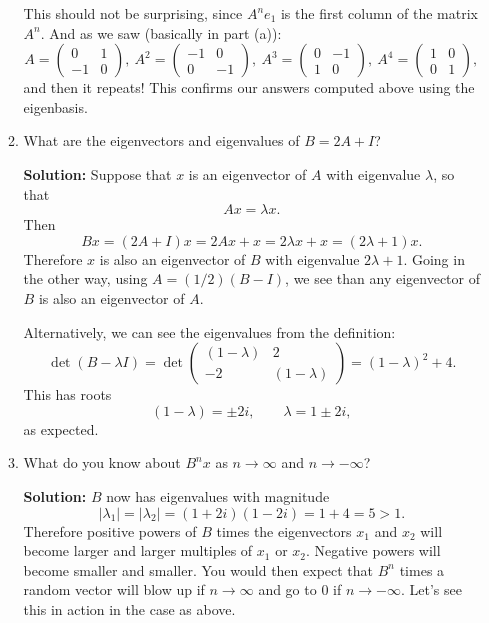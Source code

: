 \documentclass[11pt]{article}
\begin{document}
\begin{enumerate}
\begin{enumerate}
This should not be surprising, since $A^n e_1$ is the first column of the matrix $A^n$.  And as we saw (basically in part (a)):
\[A = \begin{pmatrix} 0 & 1 \\ -1 & 0 \end{pmatrix}, \ A^2 = \begin{pmatrix} -1 & 0 \\ 0 & -1 \end{pmatrix}, \ A^3 = \begin{pmatrix} 0 & -1 \\ 1 & 0 \end{pmatrix}, \ A^4 = \begin{pmatrix} 1 & 0 \\ 0 & 1 \end{pmatrix},\]
and then it repeats!  This confirms our answers computed above using the eigenbasis.

\item What are the eigenvectors and eigenvalues of $B = 2A + I$?

\textbf{Solution:} Suppose that $x$ is an eigenvector of $A$ with eigenvalue $\lambda$, so that 
\[Ax = \lambda x.\]
Then
\[Bx = (2A + I)x = 2Ax + x = 2\lambda x + x = (2\lambda + 1)x. \]
Therefore $x$ is also an eigenvector of $B$ with eigenvalue $2\lambda + 1$.
Going in the other way, using $A = (1/2)(B-I)$, we see than any eigenvector of $B$ is also an eigenvector of $A$.

Alternatively, we can see the eigenvalues from the definition:
\[\det(B - \lambda I) = \det \begin{pmatrix} (1-\lambda) & 2 \\ -2 & (1-\lambda) \end{pmatrix} = (1-\lambda)^2 + 4.\]
This has roots
\[(1-\lambda) = \pm 2 i, \qquad \lambda = 1 \pm 2 i, \]
as expected.

\item What do you know about $B^nx$ as $n \to \infty$ and $n \to -\infty$?

\textbf{Solution:} $B$ now has eigenvalues with magnitude
\[|\lambda_1| = |\lambda_2| = (1+2i)(1-2i) = 1 + 4 = 5 > 1.\]
Therefore positive powers of $B$ times the eigenvectors $x_1$ and $x_2$ will become larger and larger multiples of $x_1$ or $x_2$.  Negative powers will become smaller and smaller.  You would then expect that $B^n$ times a random vector will blow up if $n \to \infty$ and go to $0$ if $n \to - \infty$.  Let's see this in action in the case as above.


\end{enumerate}
\end{enumerate}
\end{document}
